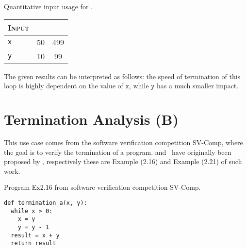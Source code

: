 \begin{margintable}
  \caption{Quantitative input usage for .}
  \centering
  \begin{tabular}{l | c c}
    \textsc{Input} & \textsc{\outcomesname{}} & \textsc{\rangename{}} \\
    \toprule
    \texttt{x} & 50 & 499 \\
    \texttt{y} & 10 & 99 \\
    \bottomrule
  \end{tabular}
\end{margintable}

The given results can be interpreted as follows: the speed of termination of this loop is highly dependent on the value of $\texttt{x}$, while $\texttt{y}$ has a much smaller impact.



\section{Termination Analysis (B)}

This use case comes from the software verification competition SV-Comp, where the goal is to verify the termination of a program.  and~ have originally been proposed by , respectively these are Example (2.16) and Example (2.21) of such work.

\begin{marginlisting}
  \caption{Program Ex2.16 from software verification competition SV-Comp.}
  \vspace{15pt}
\begin{lstlisting}[style=mystyle,
  language=customPython,
  escapechar=\%,
]
def termination_a(x, y):
  while x > 0:
    x = y
    y = y - 1
  result = x + y
  return result
\end{lstlisting}
\end{marginlisting}


